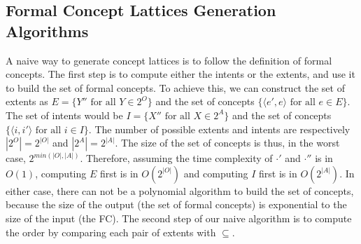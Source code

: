 
\subsection{Formal Concept Lattices Generation Algorithms\label{sec:lattice-algo}}
A naive way to generate concept lattices is to follow the definition of formal concepts.
The first step is to compute either the intents or the extents, and use it to build the set of formal concepts.
To achieve this, we can construct the set of extents as $E = \{Y'' \textrm{ for all } Y\in2^O\}$ and the set of concepts $\{\langle e', e\rangle \textrm{ for all } e \in E\}$.
The set of intents would be $I = \{X'' \textrm{ for all } X\in2^A\}$ and the set of concepts $\{\langle i, i'\rangle \textrm{ for all } i \in I\}$.
The number of possible extents and intents are respectively $|2^O| = 2^{|O|}$ and $|2^A| = 2^{|A|}$. The size of the set of concepts is thus, in the worst case, $2^{min(|O|,|A|)}$.
Therefore, assuming the time complexity of $\cdot'$ and $\cdot''$ is in $O(1)$, computing $E$ first is in $O(2^{|O|})$ and computing $I$ first is in $O(2^{|A|})$. In either case, there can not be a polynomial algorithm to build the set of concepts, because the size of the output (the set of formal concepts) is exponential to the size of the input (the FC).
%
The second step of our naive algorithm is to compute the order by comparing each pair of extents with $\subseteq$.

